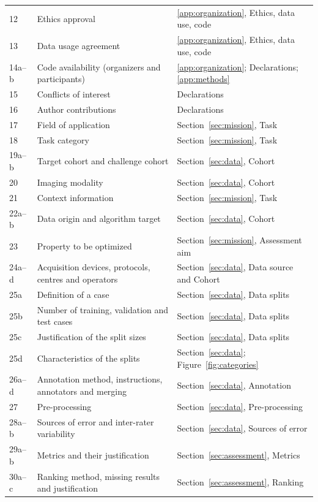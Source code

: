 \begin{table}[!p]
\begin{tabularx}{\textwidth}{l>{\raggedright\arraybackslash}p{}>{\raggedright\arraybackslash}X}
12 & Ethics approval & \ref{app:organization}, Ethics, data use, code \\
13 & Data usage agreement & \ref{app:organization}, Ethics, data use, code \\
14a--b & Code availability (organizers and participants) & \ref{app:organization}; Declarations; \ref{app:methods} \\
15 & Conflicts of interest & Declarations \\
16 & Author contributions & Declarations \\
17 & Field of application & Section~\ref{sec:mission}, Task \\
18 & Task category & Section~\ref{sec:mission}, Task \\
19a--b & Target cohort and challenge cohort & Section~\ref{sec:data}, Cohort \\
20 & Imaging modality & Section~\ref{sec:data}, Cohort \\
21 & Context information & Section~\ref{sec:mission}, Task \\
22a--b & Data origin and algorithm target & Section~\ref{sec:data}, Cohort \\
23 & Property to be optimized & Section~\ref{sec:mission}, Assessment aim \\
24a--d & Acquisition devices, protocols, centres and operators & Section~\ref{sec:data}, Data source and Cohort \\
25a & Definition of a case & Section~\ref{sec:data}, Data splits \\
25b & Number of training, validation and test cases & Section~\ref{sec:data}, Data splits \\
25c & Justification of the split sizes & Section~\ref{sec:data}, Data splits \\
25d & Characteristics of the splits & Section~\ref{sec:data}; Figure~\ref{fig:categories} \\
26a--d & Annotation method, instructions, annotators and merging & Section~\ref{sec:data}, Annotation \\
27 & Pre-processing & Section~\ref{sec:data}, Pre-processing \\
28a--b & Sources of error and inter-rater variability & Section~\ref{sec:data}, Sources of error \\
29a--b & Metrics and their justification & Section~\ref{sec:assessment}, Metrics \\
30a--c & Ranking method, missing results and justification & Section~\ref{sec:assessment}, Ranking \\

\end{tabularx}
\end{table}
